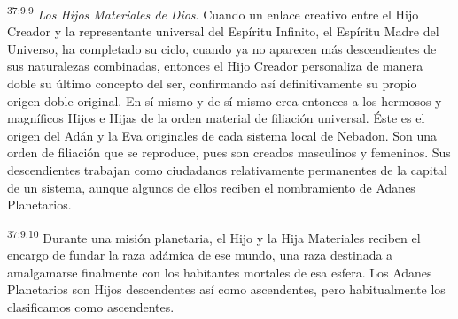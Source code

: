 \par
\textsuperscript{37:9.9} \textit{Los Hijos Materiales de Dios}. Cuando un enlace creativo entre el Hijo Creador y la representante universal del Espíritu Infinito, el Espíritu Madre del Universo, ha completado su ciclo, cuando ya no aparecen más descendientes de sus naturalezas combinadas, entonces el Hijo Creador personaliza de manera doble su último concepto del ser, confirmando así definitivamente su propio origen doble original. En sí mismo y de sí mismo crea entonces a los hermosos y magníficos Hijos e Hijas de la orden material de filiación universal. Éste es el origen del Adán y la Eva originales de cada sistema local de Nebadon. Son una orden de filiación que se reproduce, pues son creados masculinos y femeninos. Sus descendientes trabajan como ciudadanos relativamente permanentes de la capital de un sistema, aunque algunos de ellos reciben el nombramiento de Adanes Planetarios.

\par
\textsuperscript{37:9.10} Durante una misión planetaria, el Hijo y la Hija Materiales reciben el encargo de fundar la raza adámica de ese mundo, una raza destinada a amalgamarse finalmente con los habitantes mortales de esa esfera. Los Adanes Planetarios son Hijos descendentes así como ascendentes, pero habitualmente los clasificamos como ascendentes.

